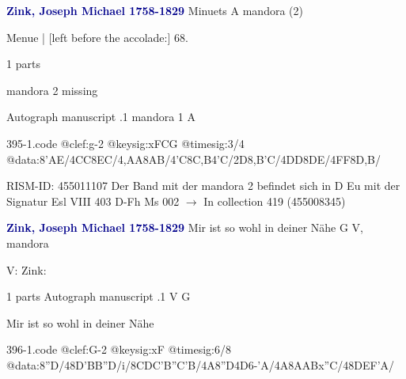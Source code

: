 \documentclass[twocolumn]{book}
\begin{document}
\newline \par \vspace{7pt} \textcolor{darkblue}{\textbf{Zink, Joseph Michael  1758-1829}}
\newline Minuets  A  
\newline mandora (2)
\newline \begin{itshape}[f.35v, at left:] Menue | [left before the accolade:] 68.\end{itshape} 
\newline \textcolor{darkblue}{}  1 parts  
\newline \begin{small} mandora 2 missing\end{small} 
\newline Autograph manuscript
.1  mandora 1  A  
\begin{filecontents*}{395-1.code}
@clef:g-2
@keysig:xFCG
@timesig:3/4
@data:{8'AE}/4CC{8EC}/4,AA{8AB}/4'C{8C,B}4'C/2D{8,B'C}/4DD{8DE}/4FF{8D,B}/
\end{filecontents*}
\newline
%

\newline RISM-ID: 455011107
\newline Der Band mit der mandora 2 befindet sich in D Eu mit der Signatur Esl VIII 403
\newline D-Fh  Ms 002
\newline $\rightarrow$ In collection 419 (455008345)

\newline \par \vspace{7pt} \textcolor{darkblue}{\textbf{Zink, Joseph Michael  1758-1829}}
\newline Mir ist so wohl in deiner Nähe  G  
\newline V, mandora
\newline \begin{itshape}[at left, f.43v:] V: Zink:\end{itshape} 
\newline \textcolor{darkblue}{}  1 parts  
\newline Autograph manuscript
.1  V  G
\newline \begin{footnotesize} Mir ist so wohl in deiner Nähe \end{footnotesize}  
\begin{filecontents*}{396-1.code}
@clef:G-2
@keysig:xF
@timesig:6/8
@data:8''D/48D'BB''D/i/{8CD}C{'B''C}'B/4A8''D4D6-'A/4A8A{AB}x''C/48DEF'A/
\end{filecontents*}
\newline
%
\end{document}

